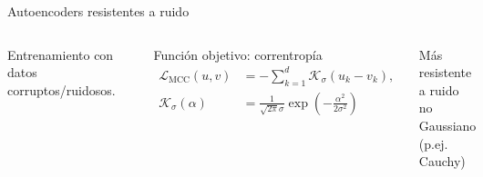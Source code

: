 \begin{frame}{Autoencoders resistentes a ruido}
\begin{columns}[t]

Entrenamiento con datos corruptos/ruidosos.

\begin{center}
\includegraphics[width=0.9\columnwidth]{../inffus/Denoising.pdf}
\end{center}


Función objetivo: correntropía
\begin{align*}
  \mathcal L_{\mathrm{MCC}}(u, v)&=-\sum_{k=1}^d\mathcal K_{\sigma}(u_k-v_k),\\
  \mathcal K_{\sigma}(\alpha)&=\frac{1}{\sqrt{2\pi}\sigma}\exp\left(-\frac{\alpha^2}{2\sigma^2}\right)
  \end{align*}

Más resistente a ruido no Gaussiano (p.ej. Cauchy)

\end{columns}
\end{frame}

